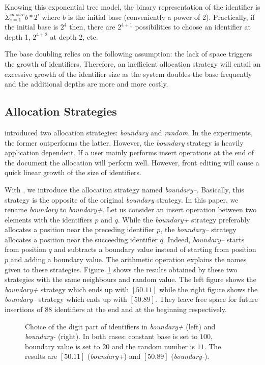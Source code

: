 Knowing this exponential tree model, the binary representation of the
identifier is $\Sigma_{i=1}^{id.size} b*2^i$ where $b$ is the initial base
(conveniently a power of 2). Practically, if the initial base is $2^4$ then,
there are $2^{4+1}$ possibilities to choose an identifier at depth 1, $2^{4+2}$
at depth 2, etc.

The base doubling relies on the following assumption: the lack of space
triggers the growth of identifiers. Therefore, an inefficient allocation
strategy will entail an excessive growth of the identifier size as the system
doubles the base frequently and the additional depths are more and more
costly.

\subsection{Allocation Strategies}

\cite{weiss2009logoot} introduced two allocation strategies: \emph{boundary}
and \emph{random}. In the experiments, the former outperforms the
latter. However, the \emph{boundary} strategy is heavily application
dependent. If a user mainly performs insert operations at the end of the
document the allocation will perform well. However, front editing will cause a
quick linear growth of the size of identifiers.

With \NAME{}, we introduce the allocation strategy named
\emph{boundary--}. Basically, this strategy is the opposite of the original
\emph{boundary} strategy. In this paper, we rename \emph{boundary} to
\emph{boundary+}. Let us consider an insert operation between two elements with
the identifiers $p$ and $q$. While the \emph{boundary+} strategy preferably
allocates a position near the preceding identifier $p$, the \emph{boundary--}
strategy allocates a position near the succeeding identifier $q$. Indeed,
\emph{boundary--} starts from position $q$ and subtracts a boundary value
instead of starting from position $p$ and adding a boundary value. The
arithmetic operation explains the names given to these
strategies. Figure~\ref{img:positionchoice} shows the results obtained by these
two strategies with the same neighbours and random value. The left figure shows
the \emph{boundary+} strategy which ends up with $[50.11]$ while the right
figure shows the \emph{boundary--} strategy which ends up with $[50.89]$. They
leave free space for future insertions of 88 identifiers at the end and at the
beginning respectively.

\begin{figure}[h]
\addtolength{\belowcaptionskip}{-10pt}
\begin{center}

\caption{Choice of the digit part of identifiers in \emph{boundary+} (left) and
  \emph{boundary-} (right). In both cases: constant base is set to $100$,
  boundary value is set to $20$ and the random number is $11$. The results are
  $[50.11]$ (\emph{boundary+}) and $[50.89]$ (\emph{boundary-}).}
\label{img:positionchoice}
\end{center}
\end{figure}

